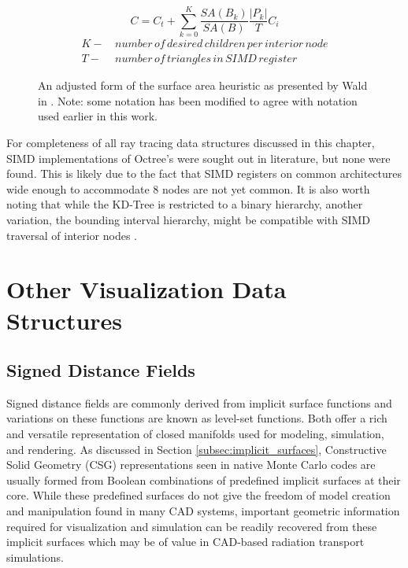 \begin{figure}[H]
  \begin{equation}
    C = C_t + \sum_{k=0}^{K} \frac{SA(B_k)}{SA(B)}\frac{|P_k|}{T}C_i
  \end{equation}
  \begin{align*}
    K - & \, number \, of \, desired \, children \, per \, interior \, node \\
    T - & \, number \, of \, triangles \, in \, SIMD \, register
  \end{align*}
  \caption{An adjusted form of the surface area heuristic as presented by Wald
    in \cite{Wald_2008}. Note: some notation has been modified to agree with
    notation used earlier in this work.}
  \label{adjusted_SAH}
\end{figure}

For completeness of all ray tracing data structures discussed in this chapter,
SIMD implementations of Octree's were sought out in literature, but none were
found. This is likely due to the fact that SIMD registers on common
architectures wide enough to accommodate 8 nodes are not yet common. It is also
worth noting that while the KD-Tree is restricted to a binary hierarchy, another
variation, the bounding interval hierarchy, might be compatible with SIMD
traversal of interior nodes \cite{Watcher_2006}.

\section{Other Visualization Data Structures}

\subsection{Signed Distance Fields}

Signed distance fields are commonly derived from implicit surface functions and
variations on these functions are known as level-set functions. Both offer a
rich and versatile representation of closed manifolds used for modeling,
simulation, and rendering. As discussed in Section
\ref{subsec:implicit_surfaces}, Constructive Solid Geometry (CSG)
representations seen in native Monte Carlo codes are usually formed from Boolean
combinations of predefined implicit surfaces at their core. While these
predefined surfaces do not give the freedom of model creation and manipulation
found in many CAD systems, important geometric information required for
visualization and simulation can be readily recovered from these implicit
surfaces which may be of value in CAD-based radiation transport simulations.

